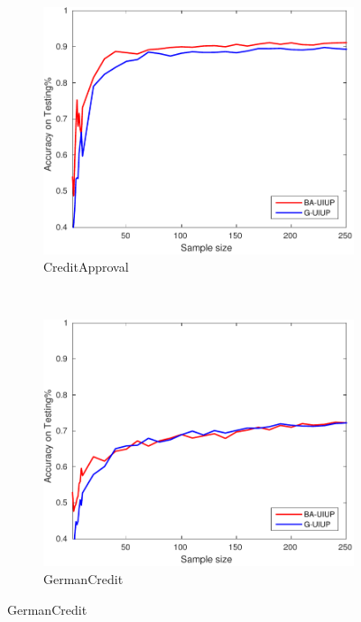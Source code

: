 \begin{figure}[ht]
\begin{subfigure}[b]{0.3\textwidth}
	\end{subfigure}
  \begin{subfigure}[b]{0.3\textwidth}
		\centering
  	\includegraphics[width=\textwidth]{figs/PLPTF/Trees/CreditApprovalDownsampledFurther_Trees_X_MH.pdf}
  	\caption{CreditApproval}
		\label{fig:Crd1}
	\end{subfigure}
  \\
  \begin{subfigure}[b]{0.3\textwidth}
		\centering
  	\includegraphics[width=\textwidth]{figs/PLPTF/Trees/GermanCreditDownsampledFurther_Trees_X_MH.pdf}
  	\caption{GermanCredit}
		\label{fig:G1}

\end{subfigure}
\end{figure}
